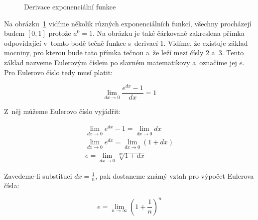 \begin{figure}
\begin{center}
\caption{Derivace exponenciální funkce}
\end{center}
\label{img:derivace_exponencialni_funkce}
\end{figure}

Na obrázku~\ref{img:derivace_exponencialni_funkce} vidíme několik různých exponenciálních funkcí, všechny procházejí budem \([0, 1]\) protože \(a^0 = 1\). Na obrázku je také čárkovaně zakreslena přímka odpovídající v~tomto bodě tečně funkce s~derivací 1. Vidíme, že existuje základ mocniny, pro kterou bude tato přímka tečnou a~že leží mezi čísly 2 a~3. Tento základ nazveme Eulerovým číslem po slavném matematikovy a~označíme jej \(e\). Pro Eulerovo číslo tedy musí platit:

\begin{equation}
\lim_{dx \to 0} \frac{e^{dx} - 1}{dx} = 1
\end{equation}

Z~něj můžeme Eulerovo číslo vyjádřit:

\begin{equation}
\begin{split}
\lim_{dx \to 0} e^{dx} - 1 = \lim_{dx \to 0} dx \\
\lim_{dx \to 0} e^{dx} = \lim_{dx \to 0} (1 + dx) \\
e = \lim_{dx \to 0} \sqrt[dx]{1 + dx}
\end{split}
\end{equation}

Zavedeme-li substituci \(dx = \frac{1}{n}\), pak dostaneme známý vztah pro výpočet Eulerova čísla:

\begin{equation}
e = \lim_{n \to \infty} \left(1 + \frac{1}{n}\right)^n
\end{equation}

